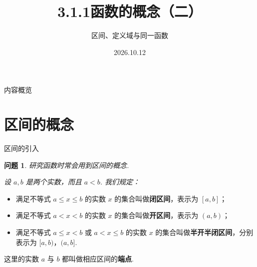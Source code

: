 \documentclass[aspectratio=169,13pt,t] {beamer}
\title[3.1.1函数的概念（二）]{3.1.1函数的概念（二）}
\subtitle{区间、定义域与同一函数}
\author[好好学习，努力向上]{}
\institute{}
\date{2026.10.12}
\newtheorem{question}{问题}
\theoremstyle{definition}
\begin{document}
\begin{frame}{}
	\titlepage
\end{frame}

\begin{frame}{内容概览}
	\tableofcontents
\end{frame}

\section{区间的概念}

\begin{frame}{区间的引入}
	\begin{question}
	研究函数时常会用到区间的概念.
	
	设 \(a, b\) 是两个实数，而且 \(a < b\). 我们规定：
	\end{question}
	\pause
	\begin{itemize}
		\item 满足不等式 \(a \leqslant x \leqslant b\) 的实数 \(x\) 的集合叫做\textbf{闭区间}，表示为 \([a, b]\)；
		\item 满足不等式 \(a < x < b\) 的实数 \(x\) 的集合叫做\textbf{开区间}，表示为 \((a, b)\)；
		\item 满足不等式 \(a \leqslant x < b\) 或 \(a < x \leqslant b\) 的实数 \(x\) 的集合叫做\textbf{半开半闭区间}，分别表示为 \([a, b)\)，\((a, b]\).
	\end{itemize}
	\pause
	\begin{summarybox-answer}
		这里的实数 \(a\) 与 \(b\) 都叫做相应区间的\textbf{端点}.
	\end{summarybox-answer}
\end{frame}

%		
\end{document}

